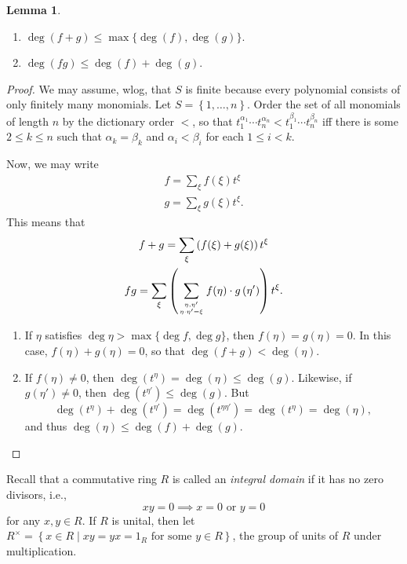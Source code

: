 \documentclass[10pt,letterpaper,cm]{nupset}
\theoremstyle{definition}
\theoremstyle{theorem}
\newtheorem{lemma}[definition]{Lemma}
\theoremstyle{remark}
\newcommand{\1}{\mathbf{1}}
\newcommand{\0}{\vec 0}
\begin{document}
\begin{lemma} $ $ 
\begin{enumerate}[label=(\arabic*)]
\item $\deg(f+g)\leq \max \{\deg(f), \deg(g)\}$.
\item $\deg(fg) \leq \deg(f) + \deg(g)$.
\end{enumerate}
\end{lemma}
\begin{proof} 
We may assume, wlog, that $S$ is finite because every polynomial consists of only finitely many monomials. Let $S = \left\{1, \ldots, n\right\}$. Order the set of all monomials of length $n$ by the dictionary order $<$, so that $t_1^{\alpha_1}\cdots t_n^{\alpha_n} < t_1^{\beta_1}\cdots t_n^{\beta_n}$ iff there is some $2\leq k \leq n$ such that $\alpha_k = \beta_k$ and $\alpha_i < \beta_i$ for each $1\leq i<k$.

Now, we may write
\begin{gather*}
f= \sum_{\xi}f(\xi)t^{\xi}
\\ g = \sum_{\xi}g(\xi)t^{\xi}.
\end{gather*} This means that 
\begin{gather*}
f+g = \sum_{\xi}\left(f(\xi) +g(\xi)\right)t^{\xi}
\\ fg = \sum_{\xi}\left(\sum_{\eta, \eta^{\prime} \atop \eta \cdot \eta^{\prime}=\xi} f(\eta) \cdot g\left(\eta^{\prime}\right)\right) t^{\xi}.
\end{gather*}
\begin{enumerate}[label=(\arabic*)]
\item If $\eta$ satisfies $\deg{\eta} > \max\{\deg{f}, \deg{g}\}$, then $f(\eta) = g(\eta) =0$. In this case, $f(\eta)+g(\eta) =0$, so that $\deg(f+g)<\deg(\eta)$.
\item If $f(\eta) \ne 0$,  then $\deg(t^{\eta}) = \deg(\eta) \leq \deg(g)$. Likewise, if $g(\eta') \ne 0$, then $\deg(t^{\eta'}) \leq \deg(g)$. But
\[
\deg(t^{\eta}) + \deg(t^{\eta'}) = \deg(t^{\eta \eta'}) = \deg(t^{\eta}) = \deg(\eta),
\] and thus $\deg(\eta) \leq \deg(f) + \deg(g)$.
\end{enumerate}
\end{proof}

\smallskip

Recall that a commutative ring $R$ is called an \textit{integral domain} if it has no zero divisors, i.e., $$xy=0 \implies x=0 \text{ or } y =0$$ for any $x,y\in R$. If $R$ is unital, then let $R^{\times} = \left\{x \in R \mid xy =yx = 1_R \text{ for some }y\in R\right\}$, the group of units of $R$ under multiplication.
\end{document}

